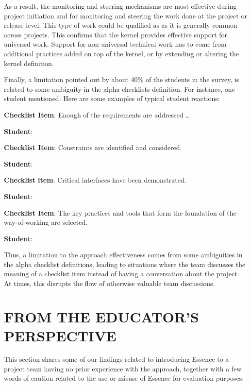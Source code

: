 As a result, the monitoring and steering mechanisms are most effective during project initiation and for monitoring and steering the work done at the project or release level. This type of work could be qualified as  as it is generally common across projects. This confirms that the kernel provides effective support for universal work. Support for non-universal technical work has to come from additional practices added on top of the kernel, or by extending or altering the kernel definition.

Finally, a limitation pointed out by about 40\% of the students in the survey, is related to some ambiguity in the alpha checklists definition. For instance, one student mentioned:  Here are some examples of typical student reactions:

\textbf{Checklist Item}: Enough of the requirements are addressed \ldots 

\textbf{Student}: 

\textbf{Checklist Item}: Constraints are identified and considered. 

\textbf{Student}: 

\textbf{Checklist item}: Critical interfaces have been demonstrated. 

\textbf{Student}: 

\textbf{Checklist Item}: The key practices and tools that form the foundation of the way-of-working are selected.

\textbf{Student}: 

Thus, a limitation to the approach effectiveness comes from some ambiguities in the alpha checklist definitions, leading to situations where the team discusses the meaning of a checklist item instead of having a conversation about the project. At times, this disrupts the flow of otherwise valuable team discussions.

\section{FROM THE EDUCATOR'S PERSPECTIVE}
This section shares some of our findings related to introducing Essence to a project team having no prior experience with the approach, together with a few words of caution related to the use or misuse of Essence for evaluation purposes.

